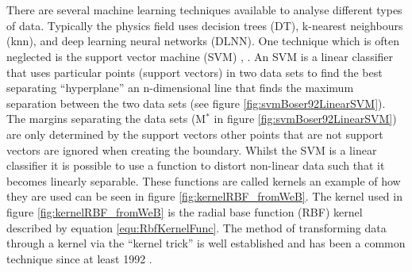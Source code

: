 \\\\There are several machine learning techniques available to analyse different types of data. Typically the physics field uses decision trees (DT), k-nearest neighbours (knn), and deep learning neural networks (DLNN). One technique which is often neglected is the support vector machine (SVM) \cite{Boser92atraining}, \cite{cortes1995support}. An SVM is a linear classifier that uses particular points (support vectors) in two data sets to find the best separating ``hyperplane'' an n-dimensional line that finds the maximum separation between the two data sets (see figure \ref{fig:svmBoser92LinearSVM}). The margins separating the data sets (M$^*$ in figure \ref{fig:svmBoser92LinearSVM}) are only determined by the support vectors other points that are not support vectors are ignored when creating the boundary. Whilst the SVM is a linear classifier it is possible to use a function to distort non-linear data such that it becomes linearly separable. These functions are called kernels an example of how they are used can be seen in figure \ref{fig:kernelRBF_fromWeB}. The kernel used in figure \ref{fig:kernelRBF_fromWeB} is the radial base function (RBF) kernel described by equation \ref{equ:RbfKernelFunc}. The method of transforming data through a kernel via the ``kernel trick'' is well established and has been a common technique since at least 1992 \cite{Boser92atraining}.
